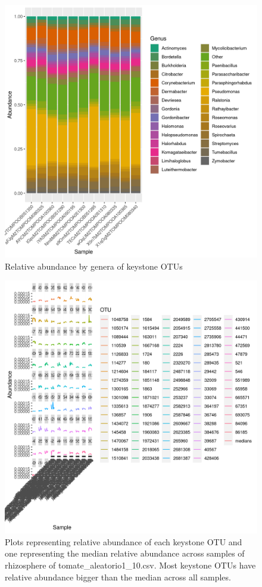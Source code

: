 \begin{figure}
\centering
\includegraphics[scale = 0.8]{tomate_aleatorio1_10.csv_relative_abundance_Genus.png}
\caption{Relative abundance by genera of keystone OTUs }
\label{fig:tomate_aleatorio1_10.csv_genus}
\end{figure}
\begin{figure}
   \centering
   \includegraphics[scale = 0.8]{abundance_tomate_aleatorio1_10.csv_key_otus_medians.png}
   \caption{Plots representing relative abundance of each keystone OTU and one representing the median relative abundance  across samples of rhizosphere of tomate_aleatorio1_10.csv. Most keystone OTUs have relative abundance bigger than the median across all samples.  }
   \label{key_otus_vs_medians_tomate_aleatorio1_10.csv}
\end{figure}

